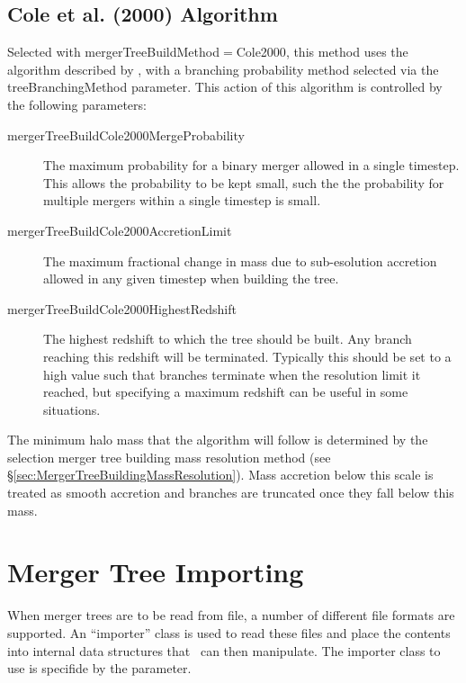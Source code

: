 \subsection{Cole et al. (2000) Algorithm}

Selected with {\normalfont \ttfamily mergerTreeBuildMethod}$=${\normalfont \ttfamily Cole2000}, this method uses the algorithm described by \cite{cole_hierarchical_2000}, with a branching probability method selected via the {\normalfont \ttfamily treeBranchingMethod} parameter. This action of this algorithm is controlled by the following parameters:
\begin{description}
 \item [{\normalfont \ttfamily mergerTreeBuildCole2000MergeProbability}] The maximum probability for a binary merger allowed in a single timestep. This allows the probability to be kept small, such the the probability for multiple mergers within a single timestep is small.
 \item [{\normalfont \ttfamily mergerTreeBuildCole2000AccretionLimit}] The maximum fractional change in mass due to sub-esolution accretion allowed in any given timestep when building the tree.
 \item [{\normalfont \ttfamily mergerTreeBuildCole2000HighestRedshift}] The highest redshift to which the tree should be built. Any branch reaching this redshift will be terminated. Typically this should be set to a high value such that branches terminate when the resolution limit it reached, but specifying a maximum redshift can be useful in some situations.
\end{description}
The minimum halo mass that the algorithm will follow is determined by the selection merger tree building mass resolution method (see \S\ref{sec:MergerTreeBuildingMassResolution}). Mass accretion below this scale is treated as smooth accretion and branches are truncated once they fall below this mass.

\section{Merger Tree Importing}\label{sec:MergerTreeImporters}

When merger trees are to be read from file, a number of different file formats are supported. An ``importer'' class is used to read these files and place the contents into internal data structures that \glc\ can then manipulate. The importer class to use is specifide by the {\normalfont \ttfamily [mergerTreeImporterMethod]} parameter.

